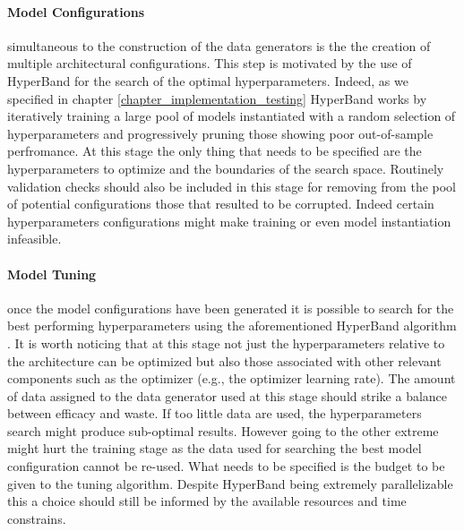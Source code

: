 \paragraph*{Model Configurations} simultaneous to the construction of the data generators is the the creation of multiple architectural configurations. This step is motivated by the use of HyperBand \cite{li2017hyperband} for the search of the optimal hyperparameters. Indeed, as we specified in chapter \ref{chapter_implementation_testing} HyperBand works by iteratively training a large pool of models instantiated with a random selection of hyperparameters and progressively pruning those showing poor out-of-sample perfromance. At this stage the only thing that needs to be specified are the hyperparameters to optimize and the boundaries of the search space. Routinely validation checks should also be included in this stage for removing from the pool of potential configurations those that resulted to be corrupted. Indeed certain hyperparameters configurations might make training or even model instantiation infeasible.

\paragraph*{Model Tuning} once the model configurations have been generated it is possible to search for the best performing hyperparameters using the aforementioned HyperBand algorithm \cite{li2017hyperband}. It is worth noticing that at this stage not just the hyperparameters relative to the architecture can be optimized but also those associated with other relevant components such as the optimizer (e.g., the optimizer learning rate). The amount of data assigned to the data generator used at this stage should strike a balance between efficacy and waste. If too little data are used, the hyperparameters search might produce sub-optimal results. However going to the other extreme might hurt the training stage as the data used for searching the best model configuration cannot be re-used. What needs to be specified is the budget to be given to the tuning algorithm. Despite HyperBand being extremely parallelizable \cite{li2017hyperband} this a choice should still be informed by the available resources and time constrains.

